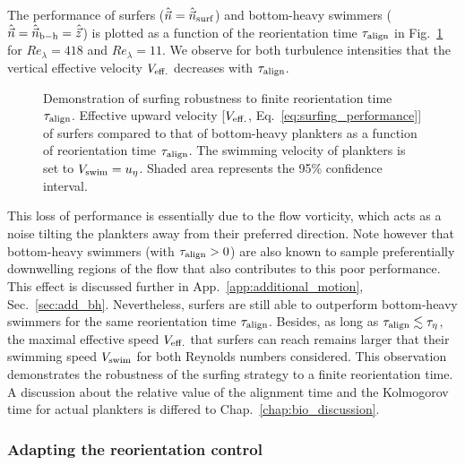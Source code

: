 The performance of surfers ($\hat{\vec{n}}=\hat{\vec{n}}_{\mathrm{surf}}$) and bottom-heavy swimmers ($\hat{\vec{n}}=\hat{\vec{n}}_{\mathrm{b-h}}=\hat{\vec{z}}$) is plotted as a function of the reorientation time $\ReorientationTime$ in Fig.~\ref{fig:surfing_reorientation_time_alt} for $\mathit{Re}_\lambda = 418$ and $\mathit{Re}_\lambda = 11$.
We observe for both turbulence intensities that the vertical effective velocity $V_{\mathrm{eff.}}$ decreases with $\ReorientationTime$.
\begin{figure}%
	\centering
	
	\caption[Demonstration of surfing robustness to finite reorientation time $\ReorientationTime$.]{
		Demonstration of surfing robustness to finite reorientation time $\ReorientationTime$.
		Effective upward velocity [$V_{\mathrm{eff.}}$, Eq.~\eqref{eq:surfing_performance}] of surfers compared to that of bottom-heavy plankters as a function of reorientation time $\ReorientationTime$.
		The swimming velocity of plankters is set to $V_{\mathrm{swim}} = u_{\eta}$.
		Shaded area represents the 95\% confidence interval.
	}
	\label{fig:surfing_reorientation_time_alt}
\end{figure}
This loss of performance is essentially due to the flow vorticity, which acts as a noise tilting the plankters away from their preferred direction.
Note however that bottom-heavy swimmers (with $\tau_{\mathrm{align}} > 0$) are also known to sample preferentially downwelling regions of the flow \citep{kessler1985hydrodynamic, durham2013turbulence} that also contributes to this poor performance.
This effect is discussed further in App.~\ref{app:additional_motion}, Sec.~\ref{sec:add_bh}.
Nevertheless, surfers are still able to outperform bottom-heavy swimmers for the same reorientation time $\ReorientationTime$.
Besides, as long as $\tau_{\mathrm{align}} \lesssim \tau_{\eta}$, the maximal effective speed $V_{\mathrm{eff.}}$ that surfers can reach remains larger that their swimming speed $V_{\mathrm{swim}}$ for both Reynolds numbers considered.
This observation demonstrates the robustness of the surfing strategy to a finite reorientation time.
A discussion about the relative value of the alignment time and the Kolmogorov time for actual plankters is differed to Chap.~\ref{chap:bio_discussion}.

\subsubsection{Adapting the reorientation control}\label{sec:surfing_on_turbulence_p_control}

